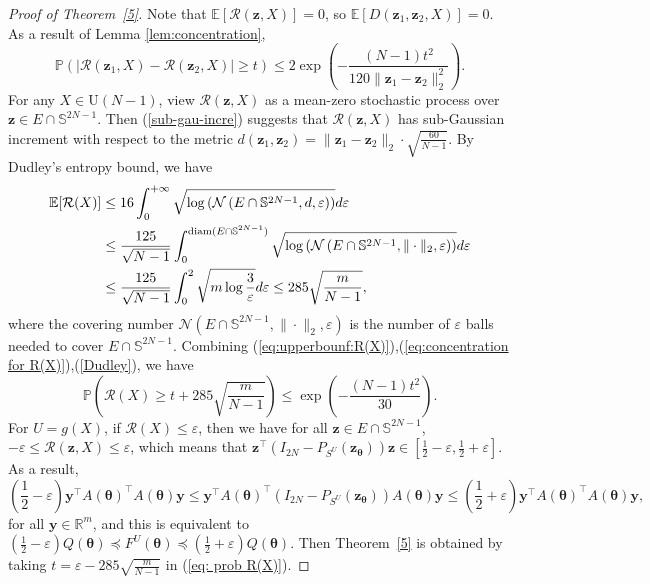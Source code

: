 \documentclass{amsart}
\theoremstyle{plain}
\theoremstyle{definition}
\theoremstyle{remark}
\newcommand{\thmref}[1]{Theorem~\ref{#1}}
\newcommand{\RR}{\mathbb{R}}
\newcommand{\PP}{\mathbb{P}}
\newcommand{\EE}{\mathbb{E}}
\begin{document}
\begin{proof}[Proof of \thmref{5}]
    Note that $\EE[\mathcal{R}(\bm{z},X)]=0$, so $\EE[D(\bm{z}_1,\bm{z}_2,X)]=0$. As a result of Lemma \ref{lem:concentration},
    \begin{equation}
    \label{sub-gau-incre}
        \PP(|\mathcal{R}(\bm{z}_1,X)-\mathcal{R}(\bm{z}_2,X)|\geq t)\leq 2\exp\left (-\frac{(N-1)t^2}{120\|\bm{z}_1-\bm{z}_2\|_2^2}\right).
    \end{equation}
    For any $X\in \mathrm U(N-1)$, view $\mathcal{R}(\bm{z},X)$ as a mean-zero stochastic process over $\bm{z}\in E\cap\mathbb{S}^{2N-1}$. Then (\ref{sub-gau-incre}) suggests that $\mathcal{R}(\bm{z},X)$ has sub-Gaussian increment with respect to the metric $d(\bm{z}_1,\bm{z}_2)=\|\bm{z}_1-\bm{z}_2\|_2\cdot\sqrt{\frac{60}{N-1}}$. By Dudley's entropy bound, we have
    \begin{align}
                \label{Dudley}
        \EE[\mathcal{R}(X)]&\leq 16\int_0^{+\infty}\sqrt{\log\left(\mathcal{N}\left(E\cap\mathbb{S}^{2N-1},d,\varepsilon\right)\right)}d\varepsilon\notag\\
        &\leq \frac{125}{\sqrt{N-1}}\int_0^{\operatorname{diam}(E\cap\mathbb{S}^{2N-1})}\sqrt{\log\left(\mathcal{N}\left(E\cap\mathbb{S}^{2N-1},\|\cdot\|_2,\varepsilon\right)\right)}d\varepsilon\notag\\
        &\leq\frac{125}{\sqrt{N-1}}\int_0^2 \sqrt{m\log\frac{3}{\varepsilon}}d\varepsilon\leq 285\sqrt{\frac{m}{N-1}},
    \end{align}
    where the covering number $\mathcal{N}\left(E\cap\mathbb{S}^{2N-1},\|\cdot\|_2,\varepsilon\right)$ is the number of $\varepsilon$ balls needed to cover $E\cap\mathbb{S}^{2N-1}$. Combining (\ref{eq:upperbounf:R(X)}),(\ref{eq:concentration for R(X)}),(\ref{Dudley}), we have
        \begin{equation}
        \label{eq: prob R(X)}
        \PP\left(\mathcal{R}(X)\geq t+285\sqrt{\frac{m}{{N-1}}}\right)\leq \exp\left(-\frac{(N-1)t^2}{30}\right).
    \end{equation}
    For $U=g(X)$, if $\mathcal{R}(X)\leq\varepsilon$, then we have for all $\bm{z}\in E\cap\mathbb S^{2N-1}$,  $-\varepsilon\leq \mathcal{R}(\bm{z},X)\leq \varepsilon$, which means that $\bm{z}^\top(I_{2N}-P_{S^U}(\bm{z}_{\bm\theta}))\bm{z}\in[\frac{1}{2}-\varepsilon,\frac{1}{2}+\varepsilon]$. As a result,
    \[(\frac{1}{2}-\varepsilon)\bm{y}^\top A(\bm\theta)^\top A(\bm\theta)\bm{y}\leq \bm{y}^\top A(\bm\theta)^\top (I_{2N}-P_{S^U}(\bm{z}_{\bm\theta}))A(\bm\theta)\bm{y}\leq (\frac{1}{2}+\varepsilon)\bm{y}^\top A(\bm\theta)^\top A(\bm\theta)\bm{y}, \]
    for all $\bm{y}\in\RR^{m}$, and this is equivalent to $(\frac{1}{2}-\varepsilon)Q(\bm\theta)\preceq F^U(\bm\theta)\preceq(\frac{1}{2}+\varepsilon)Q(\bm\theta)$. Then \thmref{5} is obtained by taking $t=\varepsilon-285\sqrt{\frac{m}{N-1}}$ in (\ref{eq: prob R(X)}).
\end{proof}
\end{document}
